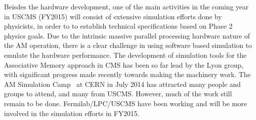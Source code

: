 Beisdes the hardware development, one of the main activities in the coming year in USCMS (FY2015) will consist of extensive simulation efforts done by physicists, in order to to establish technical specifications based on Phase 2 physics goals. Due to the intrinsic massive parallel processing hardware nature of the AM operation, there is a clear challenge in using software based simulation to emulate the hardware performance. The development of simulation tools for the Associative Memory approach in CMS has been so far lead by the Lyon group, with significant progress made recently towards making the machinery work. The AM Simulation Camp~\cite{bib:AM-CAMP} at CERN in July 2014 has attracted many people and groups to attend, and many from USCMS. However, much of the work still remain to be done. Fermilab/LPC/USCMS have been working and will be more involved in the simulation efforts in FY2015.





